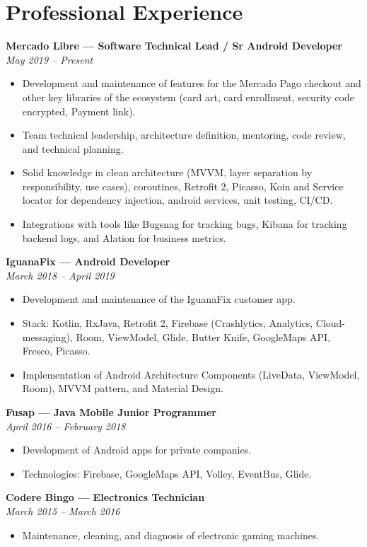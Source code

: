 \documentclass[11pt,a4paper]{article}
\newcommand{\jobtitle}[2]{
    \noindent\textbf{#1}\\
    \textit{#2}\par\vspace{0.5em}
}
\begin{document}
\section{Professional Experience}

\jobtitle{Mercado Libre — Software Technical Lead / Sr Android Developer}{May 2019 – Present}
\begin{itemize}[leftmargin=*]
    \item Development and maintenance of features for the Mercado Pago checkout and other key libraries of the ecosystem (card art, card enrollment, security code encrypted, Payment link).
    \item Team technical leadership, architecture definition, mentoring, code review, and technical planning.
    \item Solid knowledge in clean architecture (MVVM, layer separation by responsibility, use cases), coroutines, Retrofit 2, Picasso, Koin and Service locator for dependency injection, android services, unit testing, CI/CD.
    \item Integrations with tools like Bugsnag for tracking bugs, Kibana for tracking backend logs, and Alation for business metrics.
\end{itemize}

\jobtitle{IguanaFix — Android Developer}{March 2018 – April 2019}
\begin{itemize}[leftmargin=*]
    \item Development and maintenance of the IguanaFix customer app.
    \item Stack: Kotlin, RxJava, Retrofit 2, Firebase (Crashlytics, Analytics, Cloud-messaging), Room, ViewModel, Glide, Butter Knife, GoogleMaps API, Fresco, Picasso.
    \item Implementation of Android Architecture Components (LiveData, ViewModel, Room), MVVM pattern, and Material Design.
\end{itemize}

\jobtitle{Fusap — Java Mobile Junior Programmer}{April 2016 – February 2018}
\begin{itemize}[leftmargin=*]
    \item Development of Android apps for private companies.
    \item Technologies: Firebase, GoogleMaps API, Volley, EventBus, Glide.
\end{itemize}

\jobtitle{Codere Bingo — Electronics Technician}{March 2015 – March 2016}
\begin{itemize}[leftmargin=*]
    \item Maintenance, cleaning, and diagnosis of electronic gaming machines.
\end{itemize}
\end{document}
